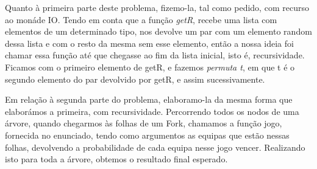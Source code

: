 \documentclass[a4paper]{article}
\newcommand{\Conid}[1]{\mathit{#1}}
\newcommand{\Varid}[1]{\mathit{#1}}
\def\resethooks{%
  \global\let\SaveRestoreHook\empty
  \global\let\ColumnHook\empty}
\let\hspre\empty
\let\hspost\empty
\begin{document}
\par Quanto à primeira parte deste problema, fizemo-la, tal como pedido, com recurso ao monáde IO. Tendo em conta que a função \emph{getR},
recebe uma lista com elementos de um determinado tipo, nos devolve um par com um elemento random dessa lista e com o resto da mesma sem esse
elemento, então a nossa ideia foi chamar essa função até que chegasse ao fim da lista inicial, isto é, recursividade. Ficamos com o primeiro elemento de getR,
e fazemos \emph{permuta t}, em que t é o segundo elemento do par devolvido por getR, e assim sucessivamente.

\par Em relação à segunda parte do problema, elaboramo-la da mesma forma que elaborámos a primeira, com recursividade. Percorrendo todos os nodos de uma árvore,
quando chegarmos às folhas de um Fork, chamamos a função jogo, fornecida no enunciado, tendo como argumentos as equipas que estão nessas folhas, devolvendo
a probabilidade de cada equipa nesse jogo vencer. Realizando isto para toda a árvore, obtemos o resultado final esperado.



\printindex


\def\hiddencode{
\begin{hscode}\SaveRestoreHook
\column{B}{@{}>{\hspre}l<{\hspost}@{}}%
\column{13}{@{}>{\hspre}l<{\hspost}@{}}%
\column{E}{@{}>{\hspre}l<{\hspost}@{}}%
\>[B]{}\mathbf{type}\;1{}\<[13]%
\>[13]{}\mathrel{=}(){}\<[E]%
\\
\>[B]{}\mathbf{type}\;\Varid{a}\times\Varid{b}\mathrel{=}(\Varid{a},\Varid{b}){}\<[E]%
\\
\>[B]{}\Varid{fork}\mathrel{=}\Varid{\Conid{Cp}.split}{}\<[E]%
\\
\>[B]{}\Varid{envia}\mathrel{=}\Varid{unsafePerformIO}{}\<[E]%
\ColumnHook
\end{hscode}\resethooks
}
\end{document}

